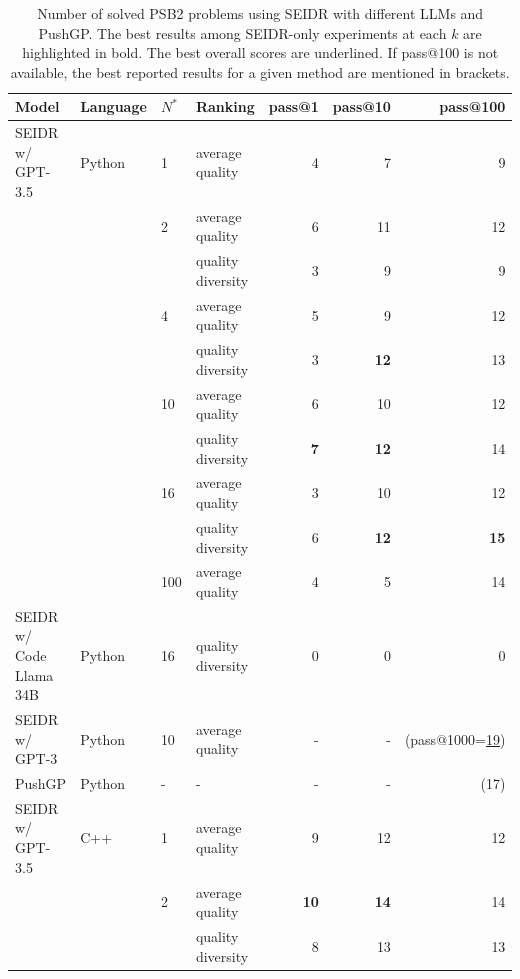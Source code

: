 \begin{table}[htb]
    \centering
    \caption{Number of solved PSB2 problems using SEIDR with different LLMs and PushGP. The best results among SEIDR-only experiments at each $k$ are highlighted in bold. The best overall scores are underlined. If pass@100 is not available, the best reported results for a given method are mentioned in brackets.}\small
    \label{tab:generalizability-psb2}
\begin{adjustbox}{max width=\textwidth}
\begin{tabular}{llllrrr}
\toprule
Model & Language & $N^*$ & Ranking &  pass@1 &  pass@10 &  pass@100 \\
\midrule
 SEIDR w/ GPT-3.5 & Python & 1   & average quality &       4 &        7 &         9 \\
&       & 2   & average quality &       6 &       11 &        12 \\
 &      &     & quality diversity  &       3 &        9 &         9 \\
 &      & 4   & average quality &       5 &        9 &        12 \\
&       &     & quality diversity  &       3 &       \textbf{12} &        13 \\
 &      & 10  & average quality &       6 &       10 &        12 \\
 &      &     & quality diversity  &       \textbf{7} &       \textbf{12} &        14 \\
 &      & 16  & average quality &       3 &       10 &        12 \\
 &      &     & quality diversity  &       6 &       \textbf{12} &        \textbf{15} \\
 &      & 100 & average quality &       4 &        5 &        14 \\
 \midrule
SEIDR w/ Code Llama 34B & Python &  16  & quality diversity &    0 &        0 &         0 \\
 SEIDR w/ GPT-3 & Python  & 10 & average quality &       - &        - &      (pass@1000=\underline{19}) \\
  \midrule
 PushGP & Python &  -   &    -            &       - &        - &      (17)\\
\midrule
\midrule
SEIDR w/ GPT-3.5 & C++ & 1   & average quality &       9 &       12 &        12 \\
  &     & 2   & average quality &      \textbf{10} &       \textbf{14} &        14 \\
  &     &     & quality diversity  &       8 &       13 &        13 \\

\end{tabular}
\end{adjustbox}
\end{table}
